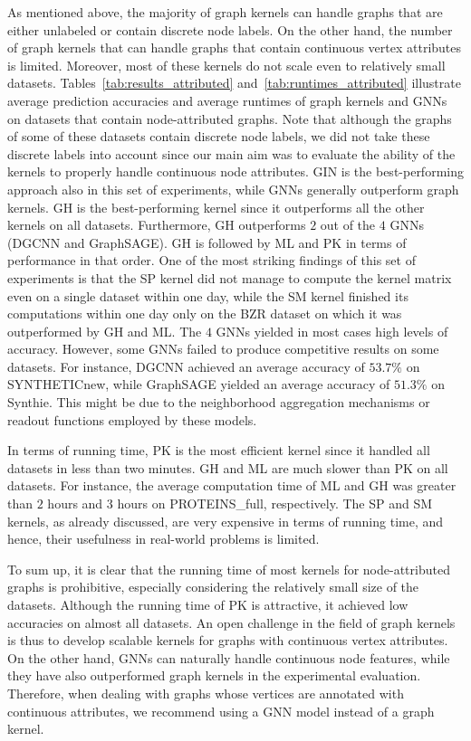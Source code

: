 \documentclass[twoside,11pt]{article}
\begin{document}
As mentioned above, the majority of graph kernels can handle graphs that are either unlabeled or contain discrete node labels.
On the other hand, the number of graph kernels that can handle graphs that contain continuous vertex attributes is limited.
Moreover, most of these kernels do not scale even to relatively small datasets.
Tables~\ref{tab:results_attributed} and~\ref{tab:runtimes_attributed} illustrate average prediction accuracies and average runtimes of graph kernels and GNNs on datasets that contain node-attributed graphs.
Note that although the graphs of some of these datasets contain discrete node labels, we did not take these discrete labels into account since our main aim was to evaluate the ability of the kernels to properly handle continuous node attributes.
GIN is the best-performing approach also in this set of experiments, while GNNs generally outperform graph kernels.
GH is the best-performing kernel since it outperforms all the other kernels on all datasets.
Furthermore, GH outperforms $2$ out of the $4$ GNNs (DGCNN and GraphSAGE).
GH is followed by ML and PK in terms of performance in that order.
One of the most striking findings of this set of experiments is that the SP kernel did not manage to compute the kernel matrix even on a single dataset within one day, while the SM kernel finished its computations within one day only on the BZR dataset on which it was outperformed by GH and ML.
The $4$ GNNs yielded in most cases high levels of accuracy.
However, some GNNs failed to produce competitive results on some datasets.
For instance, DGCNN achieved an average accuracy of $53.7\%$ on SYNTHETICnew, while GraphSAGE yielded an average accuracy of $51.3\%$ on Synthie.
This might be due to the neighborhood aggregation mechanisms or readout functions employed by these models.

In terms of running time, PK is the most efficient kernel since it handled all datasets in less than two minutes.
GH and ML are much slower than PK on all datasets.
For instance, the average computation time of ML and GH was greater than $2$ hours and $3$ hours on PROTEINS\_full, respectively.
The SP and SM kernels, as already discussed, are very expensive in terms of running time, and hence, their usefulness in real-world problems is limited.

To sum up, it is clear that the running time of most kernels for node-attributed graphs is prohibitive, especially considering the relatively small size of the datasets.
Although the running time of PK is attractive, it achieved low accuracies on almost all datasets.
An open challenge in the field of graph kernels is thus to develop scalable kernels for graphs with continuous vertex attributes.
On the other hand, GNNs can naturally handle continuous node features, while they have also outperformed graph kernels in the experimental evaluation.
Therefore, when dealing with graphs whose vertices are annotated with continuous attributes, we recommend using a GNN model instead of a graph kernel.
\end{document}
